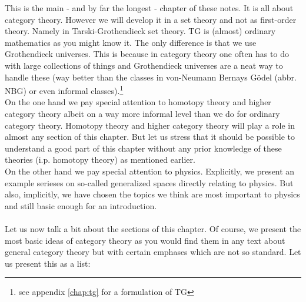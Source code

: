 This is the main - and by far the longest - chapter of these notes. It is all about category theory. However we will develop it in a set theory and not as first-order theory. Namely in Tarski-Grothendieck set theory. TG is (almost) ordinary mathematics as you might know it. The only difference is that we use {\glqq}Grothendieck universes{\grqq}. This is because in category theory one often has to do with large collections of things and Grothendieck universes are a neat way to handle these (way better than the classes in von-Neumann Bernays G\"{o}del (abbr. NBG) or even informal classes).\footnote{see appendix \ref{chap:tg} for a formulation of TG}
\\
On the one hand we pay special attention to homotopy theory and higher category theory albeit on a way more informal level than we do for ordinary category theory. Homotopy theory and higher category theory will play a role in almost any section of this chapter. But let us stress that it should be possible to understand a good part of this chapter without any prior knowledge of these theories (i.p. homotopy theory) as mentioned earlier.
\\
On the other hand we pay special attention to physics. Explicitly, we present an example serieses on so-called generalized spaces directly relating to physics. But also, implicitly, we have chosen the topics we think are most important to physics and still basic enough for an introduction.
\\\\
Let us now talk a bit about the sections of this chapter. Of course, we present the most basic ideas of category theory as you would find them in any text about general category theory but with certain emphases which are not so standard. Let us present this as a list:
